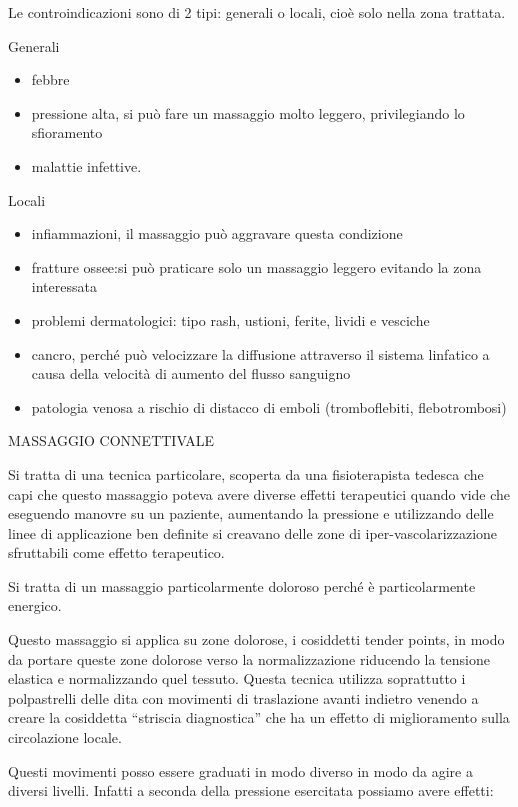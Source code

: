 \documentclass[]{article}
\begin{document}
Le controindicazioni sono di 2 tipi: generali o locali, cioè solo nella
zona trattata.

Generali

\begin{itemize}
\item
  febbre
\item
  pressione alta, si può fare un massaggio molto leggero, privilegiando
  lo sfioramento
\item
  malattie infettive.
\end{itemize}

Locali

\begin{itemize}
\item
  infiammazioni, il massaggio può aggravare questa condizione
\item
  fratture ossee:si può praticare solo un massaggio leggero evitando la
  zona interessata
\item
  problemi dermatologici: tipo rash, ustioni, ferite, lividi e vesciche
\item
  cancro, perché può velocizzare la diffusione attraverso il sistema
  linfatico a causa della velocità di aumento del flusso sanguigno
\item
  patologia venosa a rischio di distacco di emboli (tromboflebiti,
  flebotrombosi)
\end{itemize}

MASSAGGIO CONNETTIVALE

Si tratta di una tecnica particolare, scoperta da una fisioterapista
tedesca che capi che questo massaggio poteva avere diverse effetti
terapeutici quando vide che eseguendo manovre su un paziente, aumentando
la pressione e utilizzando delle linee di applicazione ben definite si
creavano delle zone di iper-vascolarizzazione sfruttabili come effetto
terapeutico.

Si tratta di un massaggio particolarmente doloroso perché è
particolarmente energico.

Questo massaggio si applica su zone dolorose, i cosiddetti tender
points, in modo da portare queste zone dolorose verso la normalizzazione
riducendo la tensione elastica e normalizzando quel tessuto. Questa
tecnica utilizza soprattutto i polpastrelli delle dita con movimenti di
traslazione avanti indietro venendo a creare la cosiddetta ``striscia
diagnostica'' che ha un effetto di miglioramento sulla circolazione
locale.

Questi movimenti posso essere graduati in modo diverso in modo da agire
a diversi livelli. Infatti a seconda della pressione esercitata possiamo
avere effetti:
\end{document}
